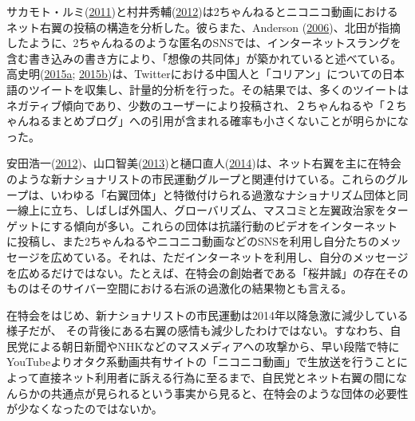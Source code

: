 \documentclass[10pt,british,A4paper,twoside]{memoir}
\begin{document}
サカモト・ルミ(\protect\hyperlink{ref-sakamoto_koreans_2011}{2011})と村井秀輔(\protect\hyperlink{ref-murai_net_2012}{2012})は2ちゃんねるとニコニコ動画におけるネット右翼の投稿の構造を分析した。彼らまた、Anderson
(\protect\hyperlink{ref-anderson_imagined_2006}{2006})、北田が指摘したように、2ちゃんねるのような匿名のSNSでは、インターネットスラングを含む書き込みの書き方により、「想像の共同体」が築かれていると述べている。高史明(\protect\hyperlink{ref-taka_twitter_2015}{2015}\protect\hyperlink{ref-taka_twitter_2015}{a};
\protect\hyperlink{ref-taka_twitter_2015-1}{2015}\protect\hyperlink{ref-taka_twitter_2015-1}{b})は、Twitterにおける中国人と「コリアン」についての日本語のツイートを収集し、計量的分析を行った。その結果では、多くのツイートはネガティブ傾向であり、少数のユーザーにより投稿され、２ちゃんねるや「２ちゃんねるまとめブログ」への引用が含まれる確率も小さくないことが明らかになった。

安田浩一(\protect\hyperlink{ref-yasuda_eng:_2012}{2012})、山口智美(\protect\hyperlink{ref-yamaguchi_xenophobia_2013}{2013})と樋口直人(\protect\hyperlink{ref-higuchi_japans_2014}{2014})は、ネット右翼を主に在特会のような新ナショナリストの市民運動グループと関連付けている。これらのグループは、いわゆる「右翼団体」と特徴付けられる過激なナショナリズム団体と同一線上に立ち、しばしば外国人、グローバリズム、マスコミと左翼政治家をターゲットにする傾向が多い。これらの団体は抗議行動のビデオをインターネットに投稿し、また2ちゃんねるやニコニコ動画などのSNSを利用し自分たちのメッセージを広めている。それは、ただインターネットを利用し、自分のメッセージを広めるだけではない。たとえば、在特会の創始者である「桜井誠」の存在そのものはそのサイバー空間における右派の過激化の結果物とも言える。

在特会をはじめ、新ナショナリストの市民運動は2014年以降急激に減少している様子だが、
その背後にある右翼の感情も減少したわけではない。すなわち、自民党による朝日新聞やNHKなどのマスメディアへの攻撃から、早い段階で特にYouTubeよりオタク系動画共有サイトの「ニコニコ動画」で生放送を行うことによって直接ネット利用者に訴える行為に至るまで、自民党とネット右翼の間になんらかの共通点が見られるという事実から見ると、在特会のような団体の必要性が少なくなったのではないか。
\end{document}
